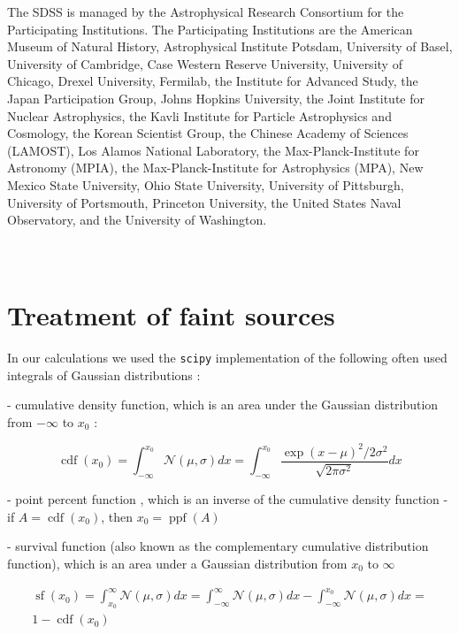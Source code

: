 \documentclass[fleqn,usenatbib]{mnras}  %
\DeclareMathOperator\cdf{cdf}
\DeclareMathOperator\sf{sf}
\DeclareMathOperator\ppf{ppf}
\begin{document}
The SDSS is managed by the Astrophysical Research Consortium for the Participating Institutions. The Participating Institutions are the American Museum of Natural History, Astrophysical Institute Potsdam, University of Basel, University of Cambridge, Case Western Reserve University, University of Chicago, Drexel University, Fermilab, the Institute for Advanced Study, the Japan Participation Group, Johns Hopkins University, the Joint Institute for Nuclear Astrophysics, the Kavli Institute for Particle Astrophysics and Cosmology, the Korean Scientist Group, the Chinese Academy of Sciences (LAMOST), Los Alamos National Laboratory, the Max-Planck-Institute for Astronomy (MPIA), the Max-Planck-Institute for Astrophysics (MPA), New Mexico State University, Ohio State University, University of Pittsburgh, University of Portsmouth, Princeton University, the United States Naval Observatory, and the University of Washington. 

\appendix
\section{\\ Treatment of faint sources}
\label{App:AppendixA}

In our calculations we used the  \verb|scipy| implementation of 
the following often used integrals of Gaussian distributions : 

- cumulative density function, which is an area under the Gaussian distribution from $-\infty$ to $x_{0}$ :

\begin{equation}
\cdf(x_{0}) = \int_{-\infty}^{x_{0}}{\mathcal{N}(\mu,\sigma)dx} = \int_{-\infty}^{x_{0}}{\frac{\exp{(x-\mu)^{2} / 2\sigma^{2}}}{\sqrt{2\pi\sigma^{2}}} dx}
\end{equation}

- point percent function , which is an inverse of the cumulative density function -  if  $A = \cdf(x_{0})$, then  $x_{0} = \ppf(A)$

- survival function (also known  as the complementary cumulative distribution function), which is an area under a Gaussian distribution from $x_{0}$ to $\infty$

\begin{multline}
\sf(x_{0}) =  \int_{x_{0}}^{\infty}{\mathcal{N}(\mu,\sigma)dx} =  \int_{-\infty}^{\infty}{\mathcal{N}(\mu,\sigma)dx} -  \int_{-\infty}^{x_{0}}{\mathcal{N}(\mu,\sigma)dx} = \\
1 - \cdf(x_{0})
\end{multline}
\end{document}
